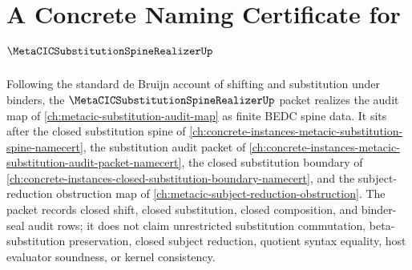 \chapter{A Concrete Naming Certificate for $\MetaCICSubstitutionSpineRealizerUp$}
\label{ch:concrete-instances-metacic-substitution-spine-realizer-namecert}

Following the standard de Bruijn account of shifting and substitution under binders, the $\MetaCICSubstitutionSpineRealizerUp$ packet realizes the audit map of \autoref{ch:metacic-substitution-audit-map} as finite BEDC spine data. It sits after the closed substitution spine of \autoref{ch:concrete-instances-metacic-substitution-spine-namecert}, the substitution audit packet of \autoref{ch:concrete-instances-metacic-substitution-audit-packet-namecert}, the closed substitution boundary of \autoref{ch:concrete-instances-closed-substitution-boundary-namecert}, and the subject-reduction obstruction map of \autoref{ch:metacic-subject-reduction-obstruction}. The packet records closed shift, closed substitution, closed composition, and binder-seal audit rows; it does not claim unrestricted substitution commutation, beta-substitution preservation, closed subject reduction, quotient syntax equality, host evaluator soundness, or kernel consistency.

